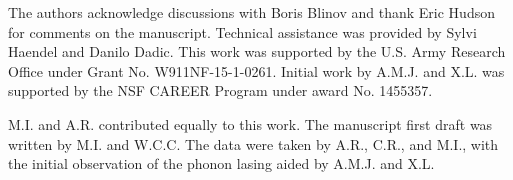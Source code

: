 \documentclass[preprint,superscriptaddress,amsmath,amssymb,aps,prl]{revtex4-1}
\begin{document}
\begin{acknowledgments}
The authors acknowledge discussions with Boris Blinov and thank Eric Hudson for comments on the manuscript.  Technical assistance was provided by Sylvi Haendel and Danilo Dadic.  This work was supported by the U.S. Army Research Office under Grant No. W911NF-15-1-0261.  Initial work by A.M.J. and X.L. was supported by the NSF CAREER Program under award No. 1455357.
\end{acknowledgments}

M.I. and A.R. contributed equally to this work. The manuscript first draft was written by M.I. and W.C.C.  The data were taken by A.R., C.R., and M.I., with the initial observation of the phonon lasing aided by A.M.J. and X.L.

\end{document}
